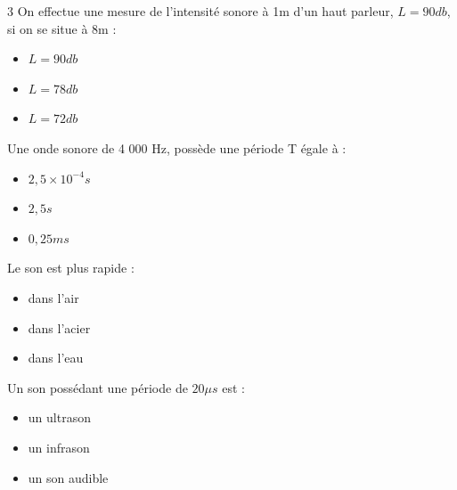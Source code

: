 \documentclass[11pt,a4paper]{article}
\begin{document}
\begin{multicols}{3}
 On effectue une mesure de l'intensité sonore à 1m d'un haut parleur, $L = 90db$, si on se situe à 8m  : 
\begin{itemize}[label=$\square$]
	\item $L = 90 db$
	\item $L = 78 db$
	\item $L = 72 db$
\end{itemize}

\columnbreak

 Une onde sonore de 4 000 Hz, possède une période T égale à  : 
\begin{itemize}[label=$\square$]
	\item $2,5 \times 10^{-4} s $
	\item $2,5 s$
	\item $0,25 ms$
\end{itemize}

 Le son est plus rapide : 
\begin{itemize}[label=$\square$]
	\item dans l'air
	\item dans l'acier
	\item dans l'eau
\end{itemize}

  Un son possédant une période de $20 \mu s$ est : 
\begin{itemize}[label=$\square$]
	\item un ultrason
	\item un infrason
	\item un son audible 
\end{itemize}

\end{multicols}
\end{document}
